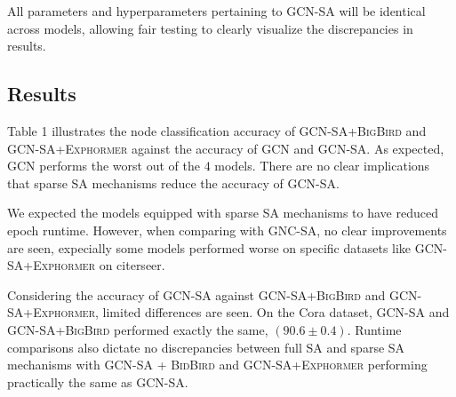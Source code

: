 All parameters and hyperparameters pertaining to \textsc{GCN-SA} 
will be identical across models,
allowing fair testing to clearly 
visualize the discrepancies in results.




\subsection{Results}
Table 1 illustrates the node classification
accuracy of \textsc{GCN-SA+BigBird} and \textsc{GCN-SA+Exphormer}
against the accuracy of \textsc{GCN} and \textsc{GCN-SA}.
As expected, \textsc{GCN} performs the worst
out of the $ 4 $ models. 
There are no clear implications that sparse SA mechanisms 
reduce the accuracy of \textsc{GCN-SA}.

We expected the models equipped with sparse SA mechanisms
to have reduced epoch runtime. 
However, when comparing with \textsc{GNC-SA}, 
no clear improvements are seen, expecially
some models performed worse on specific datasets like
\textsc{GCN-SA+Exphormer} on citerseer. 

Considering the accuracy of \textsc{GCN-SA}
against \textsc{GCN-SA+BigBird} and \textsc{GCN-SA+Exphormer},
limited differences are seen. On the Cora dataset,
\textsc{GCN-SA} and \textsc{GCN-SA+BigBird} performed exactly 
the same, $(90.6 \pm 0.4)$. Runtime comparisons also dictate
no discrepancies between full SA and sparse SA mechanisms
with \textsc{GCN-SA + BidBird} and \textsc{GCN-SA+Exphormer}
performing practically the same as \textsc{GCN-SA}.

